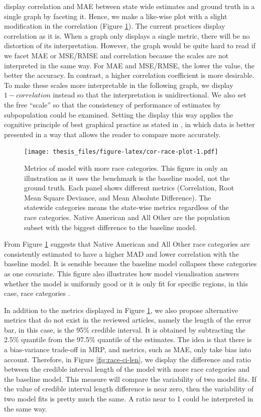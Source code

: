 \documentclass{monashthesis}
\begin{document}
\textcite{WarshawChristopher2012HSWM} display correlation and MAE between state wide estimates and ground truth in a single graph by faceting it. Hence, we make a like-wise plot with a slight modification in the correlation (Figure \ref{fig:cor-race-plot}). The current practices display correlation as it is. When a graph only displays a single metric, there will be no distortion of its interpretation. However, the graph would be quite hard to read if we facet MAE or MSE/RMSE and correlation because the scales are not interpreted in the same way. For MAE and MSE/RMSE, the lower the value, the better the accuracy. In contrast, a higher correlation coefficient is more desirable. To make these scales more interpretable in the following graph, we display \(1 - correlation\) instead so that the interpretation is unidirectional. We also set the free ``scale'' so that the consistency of performance of estimates by subpopulation could be examined. Setting the display this way applies the cognitive principle of best graphical practice as stated in \textcite{vanderplas}, in which data is better presented in a way that allows the reader to compare more accurately.

\begin{figure}
\centering
\texttt{[image: thesis\_files/figure-latex/cor-race-plot-1.pdf]}
\caption{\label{fig:cor-race-plot}Metrics of model with more race categories. This figure in only an illustration as it uses the benchmark is the baseline model, not the ground truth. Each panel shows different metrics (Correlation, Root Mean Square Deviance, and Mean Absolute Difference). The statewide categories means the state-wise metrics regardless of the race categories. Native American and All Other are the population subset with the biggest difference to the baseline model.}
\end{figure}

From Figure \ref{fig:cor-race-plot} suggests that Native American and All Other race categories are consistently estimated to have a higher MAD and lower correlation with the baseline model. It is sensible because the baseline model collapses these categories as one covariate. This figure also illustrates how model visualisation answers whether the model is uniformly good or it is only fit for specific regions, in this case, race categories \autocite{WickhamHadley2015VsmR}.

In addition to the metrics displayed in Figure \ref{fig:cor-race-plot}, we also propose alternative metrics that do not exist in the reviewed articles, namely the length of the error bar, in this case, is the 95\% credible interval. It is obtained by subtracting the 2.5\% quantile from the 97.5\% quantile of the estimates. The idea is that there is a bias-variance trade-off in MRP, and metrics, such as MAE, only take bias into account. Therefore, in Figure \ref{fig:race-ci-len}, we display the difference and ratio between the credible interval length of the model with more race categories and the baseline model. This measure will compare the variability of two model fits. If the value of credible interval length difference is near zero, then the variability of two model fits is pretty much the same. A ratio near to 1 could be interpreted in the same way.
\end{document}
